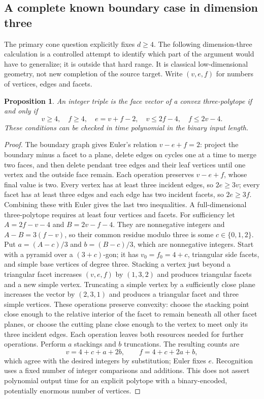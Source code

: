 \documentclass[11pt]{article}
\newtheorem{proposition}{Proposition}
\begin{document}
\subsection{A complete known boundary case in dimension three}
The primary cone question explicitly fixes $d\ge4$. The following dimension-three calculation is a controlled attempt to identify which part of the argument would have to generalize; it is outside that hard range. It is classical low-dimensional geometry, not new completion of the source target. Write $(v,e,f)$ for numbers of vertices, edges and facets.
\begin{proposition}
An integer triple is the face vector of a convex three-polytope if and only if
\[
v\ge4,\quad f\ge4,\quad e=v+f-2,\quad v\le2f-4,\quad f\le2v-4.
\]
These conditions can be checked in time polynomial in the binary input length.
\end{proposition}
\begin{proof}
The boundary graph gives Euler's relation $v-e+f=2$: project the boundary minus a facet to a plane, delete edges on cycles one at a time to merge two faces, and then delete pendant tree edges and their leaf vertices until one vertex and the outside face remain. Each operation preserves $v-e+f$, whose final value is two. Every vertex has at least three incident edges, so $2e\ge3v$; every facet has at least three edges and each edge has two incident facets, so $2e\ge3f$. Combining these with Euler gives the last two inequalities. A full-dimensional three-polytope requires at least four vertices and facets.
For sufficiency let $A=2f-v-4$ and $B=2v-f-4$. They are nonnegative integers and $A-B=3(f-v)$, so their common residue modulo three is some $c\in\{0,1,2\}$. Put $a=(A-c)/3$ and $b=(B-c)/3$, which are nonnegative integers. Start with a pyramid over a $(3+c)$-gon; it has $v_0=f_0=4+c$, triangular side facets, and simple base vertices of degree three. Stacking a vertex just beyond a triangular facet increases $(v,e,f)$ by $(1,3,2)$ and produces triangular facets and a new simple vertex. Truncating a simple vertex by a sufficiently close plane increases the vector by $(2,3,1)$ and produces a triangular facet and three simple vertices. These operations preserve convexity: choose the stacking point close enough to the relative interior of the facet to remain beneath all other facet planes, or choose the cutting plane close enough to the vertex to meet only its three incident edges. Each operation leaves both resources needed for further operations. Perform $a$ stackings and $b$ truncations. The resulting counts are
\[
v=4+c+a+2b,\qquad f=4+c+2a+b,
\]
which agree with the desired integers by substitution; Euler fixes $e$. Recognition uses a fixed number of integer comparisons and additions. This does not assert polynomial output time for an explicit polytope with a binary-encoded, potentially enormous number of vertices.
\end{proof}
\end{document}
